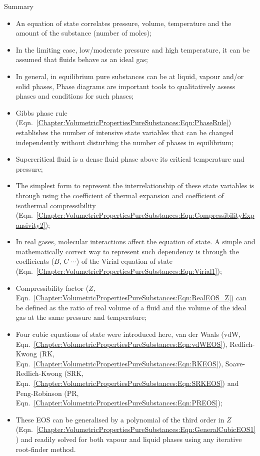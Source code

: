 \clearpage   
\begin{FinalSummaryBlock}{Summary}
    \begin{itemize}
       \item An equation of state correlates pressure, volume, temperature and the amount of the substance (\eg number of moles);
       \item In the limiting case, \ie low/moderate pressure and high temperature, it can be assumed that fluids behave as an ideal gas;
       \item In general, in equilibrium pure substances can be at liquid, vapour and/or solid phases, Phase diagrams are important tools to qualitatively assess phases and conditions for such phases;
       \item Gibbs phase rule (Eqn.~\ref{Chapter:VolumetricPropertiesPureSubstances:Eqn:PhaseRule}) establishes the number of intensive state variables that can be changed independently without disturbing the number of phases in equilibrium;
       \item Supercritical fluid is a dense fluid phase above its critical temperature and pressure;
       \item The simplest form to represent the interrelationship of these state variables is through using the coefficient of thermal expansion and coefficient of isothermal compressibility (Eqn.~\ref{Chapter:VolumetricPropertiesPureSubstances:Eqn:CompressibilityExpansivity2});
       \item In real gases, molecular interactions affect the equation of state. A simple and mathematically correct way to represent such dependency is through the coefficients ($B$, $C$ $\cdots$) of the Virial equation of state (Eqn.~\ref{Chapter:VolumetricPropertiesPureSubstances:Eqn:Virial1});
       \item Compressibility factor ($Z$, Eqn.~\ref{Chapter:VolumetricPropertiesPureSubstances:Eqn:RealEOS_Z}) can be defined as the ratio of real volume of a fluid and the volume of the ideal gas at the same pressure and temperature;
       \item Four cubic equations of state were introduced here, van der Waals (vdW, Eqn.~\ref{Chapter:VolumetricPropertiesPureSubstances:Eqn:vdWEOS}), Redlich-Kwong (RK, Eqn.~\ref{Chapter:VolumetricPropertiesPureSubstances:Eqn:RKEOS}), Soave-Redlich-Kwong (SRK, Eqn.~\ref{Chapter:VolumetricPropertiesPureSubstances:Eqn:SRKEOS}) and Peng-Robinson (PR, Eqn.~\ref{Chapter:VolumetricPropertiesPureSubstances:Eqn:PREOS});
       \item These EOS can be generalised by a polynomial of the third order in $Z$ (Eqn.~\ref{Chapter:VolumetricPropertiesPureSubstances:Eqn:GeneralCubicEOS1}) and readily solved for both vapour and liquid phases using any iterative root-finder method.
    \end{itemize}
\end{FinalSummaryBlock}


